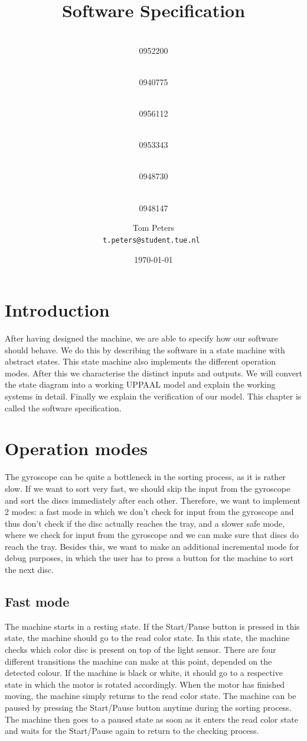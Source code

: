 \documentclass[a4paper,oneside,11pt]{article}
\title{\vspace{-\baselineskip}\sffamily\bfseries Software Specification}
\author{
	\makebox[.25\linewidth]{Sergio van Amerongen}\\0952200 \and
	\makebox[.25\linewidth]{Stefan Cloudt}\\0940775 \and
	\makebox[.25\linewidth]{Daan de Graaf}\\0956112 \and
	\makebox[.25\linewidth]{Robert van Lente}\\0953343 \and
	\makebox[.25\linewidth]{Tom Peters}\\0948730 \and
	\makebox[.25\linewidth]{Berrie Trippe}\\0948147 
	\and \makebox[.75\linewidth]{\textbf{Responsible:}} \and
	Tom Peters\\ \tt{t.peters@student.tue.nl}
}
\date{\today}
\begin{document}
\maketitle

\section{Introduction}
After having designed the machine, we are able to specify how our software should behave. We do this by describing the software in a state machine with abstract states. This state machine also implements the different operation modes. After this we characterise the distinct inputs and outputs. We will convert the state diagram into a working UPPAAL model and explain the working systems in detail. Finally we explain the verification of our model. This chapter is called the software specification.

\section{Operation modes}
The gyroscope can be quite a bottleneck in the sorting process, as it is rather slow. If we want to sort very fast, we should skip the input from the gyroscope and sort the discs immediately after each other. Therefore, we want to implement 2 modes: a fast mode in which we don’t check for input from the gyroscope and thus don’t check if the disc actually reaches the tray, and a slower safe mode, where we check for input from the gyroscope and we can make sure that discs do reach the tray. Besides this, we want to make an additional incremental mode for debug purposes, in which the user has to press a button for the machine to sort the next disc.

\subsection{Fast mode}
The machine starts in a resting state. If the Start/Pause button is pressed in this state, the machine should go to the read color state. In this state, the machine checks which color disc is present on top of the light sensor. There are four different transitions the machine can make at this point, depended on the detected colour. If the machine is black or white, it should go to a respective state in which the motor is rotated accordingly. When the motor has finished moving, the machine simply returns to the read color state. The machine can be paused by pressing the Start/Pause button anytime during the sorting process. The machine then goes to a paused state as soon as it enters the read color state and waits for the Start/Pause again to return to the checking process.
\end{document}
